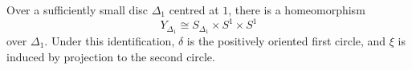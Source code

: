 \begin{lem}\label{lem: product at 1}
Over a sufficiently small disc $\Delta_1$ centred at $1$, there is
a homeomorphism
\[
 Y_{\Delta_1}\cong S_{\Delta_1}\times S^1\times S^1
\]
over $\Delta_1$. Under this identification, $\delta$ is the
positively oriented first circle, and $\xi$ is induced by
projection to the second circle.
\end{lem}